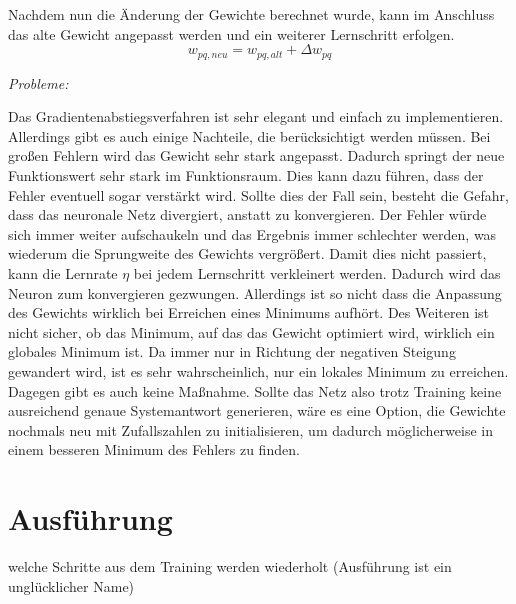 Nachdem nun die Änderung der Gewichte berechnet wurde, kann im Anschluss das alte Gewicht angepasst werden und ein weiterer Lernschritt erfolgen.
\begin{equation}
w_{pq, neu}=w_{pq, alt}+\Delta w_{pq}
\end{equation}

\emph{Probleme:}

Das Gradientenabstiegsverfahren ist sehr elegant und einfach zu implementieren. Allerdings gibt es auch einige Nachteile, die berücksichtigt werden müssen. Bei großen Fehlern wird das Gewicht sehr stark angepasst. Dadurch springt der neue Funktionswert sehr stark im Funktionsraum. Dies kann dazu führen, dass der Fehler eventuell sogar verstärkt wird. Sollte dies der Fall sein, besteht die Gefahr, dass das neuronale Netz divergiert, anstatt zu konvergieren. Der Fehler würde sich immer weiter aufschaukeln und das Ergebnis immer schlechter werden, was wiederum die Sprungweite des Gewichts vergrößert. Damit dies nicht passiert, kann die Lernrate $\eta$ bei jedem Lernschritt verkleinert werden. Dadurch wird das Neuron zum konvergieren gezwungen. Allerdings ist so nicht dass die Anpassung des Gewichts wirklich bei Erreichen eines Minimums aufhört. 
Des Weiteren ist nicht sicher, ob das Minimum, auf das das Gewicht optimiert wird, wirklich ein globales Minimum ist. Da immer nur in Richtung der negativen Steigung gewandert wird, ist es sehr wahrscheinlich, nur ein lokales Minimum zu erreichen. Dagegen gibt es auch keine Maßnahme. Sollte das Netz also trotz Training keine ausreichend genaue Systemantwort generieren, wäre es eine Option, die Gewichte nochmals neu mit Zufallszahlen zu initialisieren, um dadurch möglicherweise in einem besseren Minimum des Fehlers zu finden.

\section{Ausführung}
welche Schritte aus dem Training werden wiederholt
(Ausführung ist ein unglücklicher Name)